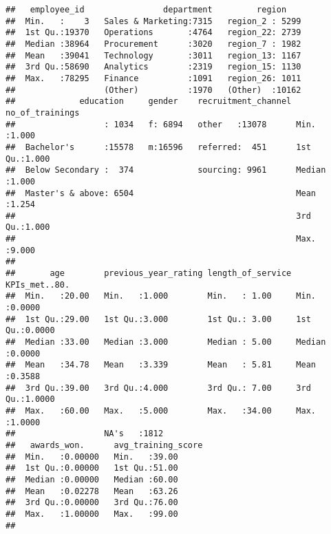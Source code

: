 \documentclass[
]{article}
\newenvironment{Shaded}{\begin{snugshade}}{\end{snugshade}}
\newcommand{\CommentTok}[1]{\textcolor[rgb]{0.56,0.35,0.01}{\textit{#1}}}
\newcommand{\KeywordTok}[1]{\textcolor[rgb]{0.13,0.29,0.53}{\textbf{#1}}}
\newcommand{\NormalTok}[1]{#1}
\newcommand{\OperatorTok}[1]{\textcolor[rgb]{0.81,0.36,0.00}{\textbf{#1}}}
\begin{document}
\begin{verbatim}
##   employee_id                department         region     
##  Min.   :    3   Sales & Marketing:7315   region_2 : 5299  
##  1st Qu.:19370   Operations       :4764   region_22: 2739  
##  Median :38964   Procurement      :3020   region_7 : 1982  
##  Mean   :39041   Technology       :3011   region_13: 1167  
##  3rd Qu.:58690   Analytics        :2319   region_15: 1130  
##  Max.   :78295   Finance          :1091   region_26: 1011  
##                  (Other)          :1970   (Other)  :10162  
##             education     gender    recruitment_channel no_of_trainings
##                  : 1034   f: 6894   other   :13078      Min.   :1.000  
##  Bachelor's      :15578   m:16596   referred:  451      1st Qu.:1.000  
##  Below Secondary :  374             sourcing: 9961      Median :1.000  
##  Master's & above: 6504                                 Mean   :1.254  
##                                                         3rd Qu.:1.000  
##                                                         Max.   :9.000  
##                                                                        
##       age        previous_year_rating length_of_service KPIs_met..80.   
##  Min.   :20.00   Min.   :1.000        Min.   : 1.00     Min.   :0.0000  
##  1st Qu.:29.00   1st Qu.:3.000        1st Qu.: 3.00     1st Qu.:0.0000  
##  Median :33.00   Median :3.000        Median : 5.00     Median :0.0000  
##  Mean   :34.78   Mean   :3.339        Mean   : 5.81     Mean   :0.3588  
##  3rd Qu.:39.00   3rd Qu.:4.000        3rd Qu.: 7.00     3rd Qu.:1.0000  
##  Max.   :60.00   Max.   :5.000        Max.   :34.00     Max.   :1.0000  
##                  NA's   :1812                                           
##   awards_won.      avg_training_score
##  Min.   :0.00000   Min.   :39.00     
##  1st Qu.:0.00000   1st Qu.:51.00     
##  Median :0.00000   Median :60.00     
##  Mean   :0.02278   Mean   :63.26     
##  3rd Qu.:0.00000   3rd Qu.:76.00     
##  Max.   :1.00000   Max.   :99.00     
## 
\end{verbatim}

\begin{Shaded}
\end{Shaded}
\end{document}
